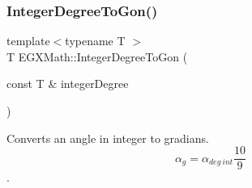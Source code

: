 \mbox{\label{group___e_g_x_math-_angle_conversions-_integer_degree_ga6e5be425c37ad27319f09329156c64bb}} 
\subsubsection{\texorpdfstring{Integer\+Degree\+To\+Gon()}{IntegerDegreeToGon()}}
{\footnotesize\ttfamily template$<$typename T $>$ \\
T E\+G\+X\+Math\+::\+Integer\+Degree\+To\+Gon (\begin{DoxyParamCaption}\item[{const T \&}]{integer\+Degree }\end{DoxyParamCaption})}



Converts an angle in integer to gradians. \[\alpha_{g}=\alpha_{deg\ int}\frac{10}{9}\]. 

